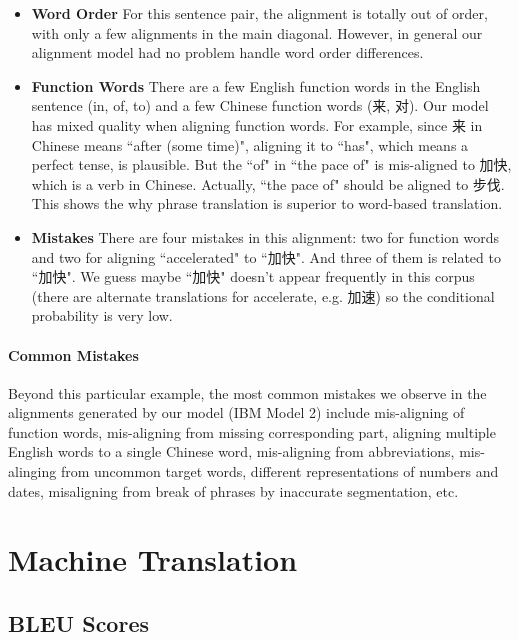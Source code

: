 \documentclass{article}
\begin{document}
\begin{CJK*}{UTF8}{gbsn}

\begin{itemize}
\item \textbf{Word Order} For this sentence pair, the alignment is totally out of order, with only a few alignments in the main diagonal. However, in general our alignment model had no problem handle word order differences.
\item \textbf{Function Words} There are a few English function words in the English sentence (in, of, to) and a few Chinese function words (来, 对). Our model has mixed quality when aligning function words. For example, since 来 in Chinese means ``after (some time)", aligning it to ``has", which means a perfect tense, is plausible. But the ``of" in ``the pace of" is mis-aligned to 加快, which is a verb in Chinese. Actually, ``the pace of" should be aligned to 步伐. This shows the why phrase translation is superior to word-based translation.
\item \textbf{Mistakes} There are four mistakes in this alignment: two for function words and two for aligning ``accelerated" to ``加快". And three of them is related to ``加快". We guess maybe ``加快" doesn't appear frequently in this corpus (there are alternate translations for accelerate, e.g. 加速) so the conditional probability is very low.
\end{itemize}

\paragraph{Common Mistakes} Beyond this particular example, the most common mistakes we observe in the alignments generated by our model (IBM Model 2) include mis-aligning of function words, mis-aligning from missing corresponding part, aligning multiple English words to a single Chinese word, mis-aligning from abbreviations, mis-alinging from uncommon target words, different representations of numbers and dates, misaligning from break of phrases by inaccurate segmentation, etc.

\clearpage\end{CJK*}

\section{Machine Translation}

\subsection{BLEU Scores}
\end{document}
